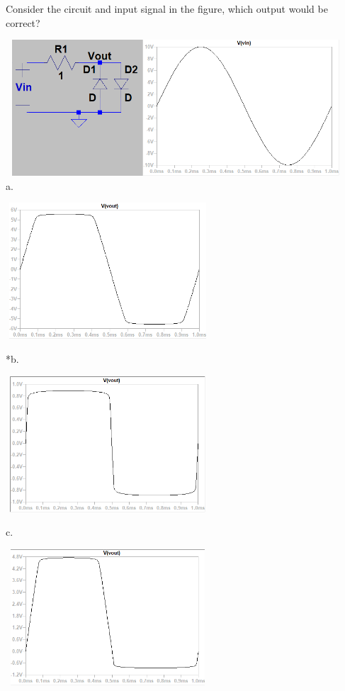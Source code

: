 
Consider the circuit and input signal in the figure, which output would be correct?

\includegraphics[width=5in,height=2in]{../../Images/OPampsTransistorsDiodesQ15.png} \\



a.

\includegraphics[width=3in,height=2in]{../../Images/OPampsTransistorsDiodesQ15a.png}


*b.

\includegraphics[width=3in,height=2in]{../../Images/OPampsTransistorsDiodesQ15b.png}


c.

\includegraphics[width=3in,height=2in]{../../Images/OPampsTransistorsDiodesQ15c.png}


